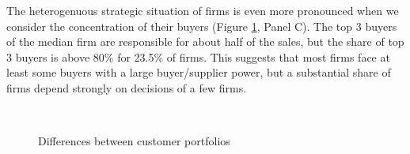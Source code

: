 \documentclass[final, dvipsnames, authoryear,12pt]{elsarticle}
\begin{document}
The heterogenuous strategic situation of firms is even more pronounced when we consider the concentration of their buyers (Figure \ref{fig:happy_few}, Panel C). The top 3 buyers of the median firm are responsible for about half of the sales, but the share of top 3 buyers is above 80\% for 23.5\% of firms. This suggests that most firms face at least some buyers with a large buyer/supplier power, but a substantial share of firms depend strongly on decisions of a few firms.

\begin{figure}[!h]
    \caption{Differences between customer portfolios}
    \label{fig:happy_few}
    \begin{center}
    \\

\end{center}
\end{figure}
\end{document}
